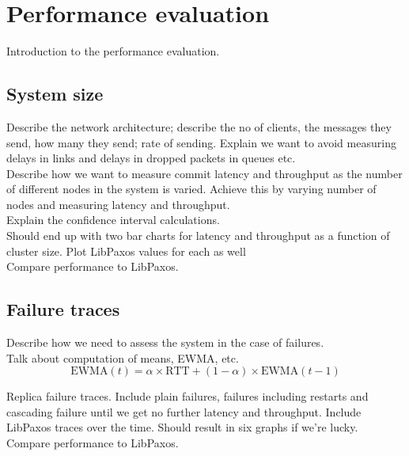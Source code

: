 \section{Performance evaluation}

Introduction to the performance evaluation.

\subsection{System size}

Describe the network architecture; describe the no of clients, the messages they send, how many they send; rate of sending. Explain we want to avoid measuring delays in links and delays in dropped packets in queues etc. \\

Describe how we want to measure commit latency and throughput as the number of different nodes in the system is varied. Achieve this by varying number of nodes and measuring latency and throughput. \\

Explain the confidence interval calculations. \\

{\color{blue}Should end up with two bar charts for latency and throughput as a function of cluster size. Plot LibPaxos values for each as well} \\

Compare performance to LibPaxos.

\subsection{Failure traces}

Describe how we need to assess the system in the case of failures. \\

Talk about computation of means, EWMA, etc. \\

$$ \textrm{EWMA} \left( t \right) = \alpha \times \textrm{RTT} + (1 - \alpha ) \times \textrm{EWMA} \left( t - 1 \right)$$

{\color{blue}Replica failure traces. Include plain failures, failures including restarts and cascading failure until we get no further latency and throughput. Include LibPaxos traces over the time. Should result in six graphs if we're lucky.} \\

Compare performance to LibPaxos.



